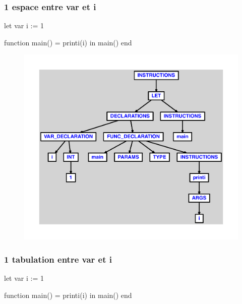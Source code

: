 \documentclass{article}
\begin{document}
\subsubsection{1 espace entre var et i}
\begin{verbatimtab}
let
	var i := 1

	function main() = printi(i)
in main() end
\end{verbatimtab}
\begin{figure}[H]\centering\includegraphics[max width=\textwidth]{ast/ast_332.pdf}\end{figure}\subsubsection{1 tabulation entre var et i}
\begin{verbatimtab}
let
	var	i := 1

	function main() = printi(i)
in main() end
\end{verbatimtab}
\end{document}
